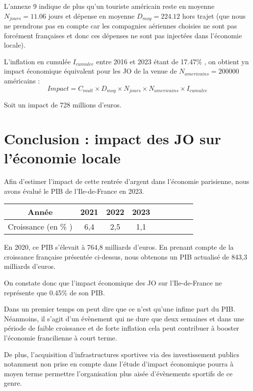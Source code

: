 \documentclass{article}
\begin{document}
  L'annexe 9 indique de plus qu'un touriste américain reste en moyenne $N_{jours} = 11.06$ jours et dépense en moyenne $D_{moy}=224.12 $ \texteuro hors trajet (que nous ne prendrons pas en compte car les compagnies aériennes choisies ne sont pas forcément françaises et donc ces dépenses ne sont pas injectées dans l'économie locale).
  \vspace{0.5cm}

  L'inflation en cumulée $I_{cumulee}$ entre 2016 et 2023 étant de 17.47\% , on obtient yn impact économique équivalent pour les JO de la venue de $N_{americains} = 200 000$ américains :
  $$ Impact = C_{mult} \times D_{moy} \times N_{jours} \times N_{americains} \times I_{cumulee}$$

  Soit un impact de 728 millions d'euros.
\section{Conclusion : impact des JO sur l'économie locale}



  Afin d'estimer l'impact de cette rentrée d'argent dans l'économie parisienne, nous avons évalué le PIB de l'Ile-de-France en 2023. 

  
  \vspace{0.5cm}
  \begin{center}
    \begin{tabular}{ | c | c | c |  c |  c |  c |  c |  c |  c | }
      \hline
      Année & 2021 & 2022 & 2023  \\ \hline
      Croissance (en \% ) & 6,4 & 2,5 & 1,1  \\ \hline
    \end{tabular}
  \end{center}
    \vspace{0.5cm}

  En 2020, ce PIB s'élevait à 764,8 milliards d'euros. En prenant compte de la croissance française présentée ci-dessus, nous obtenons un PIB actualisé de 843,3 milliards d'euros.
  \vspace{0.5cm}

  On constate donc que l'impact économique des JO sur l'Ile-de-France ne représente que 0.45\% de son PIB.
  \vspace{0.5cm}

  Dans un premier temps on peut dire que ce n'est qu'une infime part du PIB. Néanmoins, il s'agit d'un évènement qui ne dure que deux semaines et  dans une période de faible croissance et de forte inflation cela peut contribuer à booster l'économie francilienne à court terme. 
  \vspace{0.5cm}


  De plus, l'acquisition d'infrastructures sportives via des investissement publics notamment non prise en compte dans l'étude d'impact économique pourra à moyen terme permettre l'organisation plus aisée d'évènements sportifs de ce genre.
\end{document}
